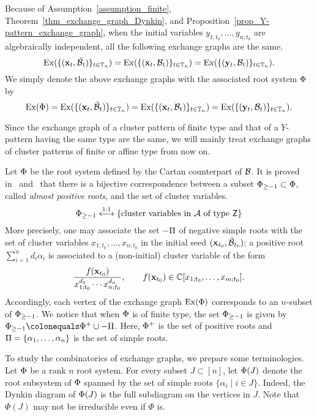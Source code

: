 Because of Assumption~\ref{assumption_finite}, Theorem~\ref{thm_exchange_graph_Dynkin}, and Proposition~\ref{prop_Y-pattern_exchange_graph}, 
when the initial variables $y_{1;t_0},\dots,y_{n;t_0}$ are algebraically independent, all the following exchange graphs are the same.
\[
\operatorname{Ex}(\{(\mathbf{x}_t, \mathcal{\tilde{B}}_t)\}_{t \in \mathbb T_n})
 = \operatorname{Ex}(\{(\mathbf{x}_t, \mathcal{B}_t)\}_{t \in \mathbb T_n})
= \operatorname{Ex}(\{(\mathbf{y}_t, \mathcal{B}_t)\}_{t \in \mathbb T_n}).
\]
We simply denote the above exchange graphs with the associated root system $\Phi$ by
\begin{equation}\label{eq_exchange_graphs_are_the_same}
\operatorname{Ex}(\Phi) = \operatorname{Ex}(\{(\mathbf{x}_t, \mathcal{\tilde{B}}_t)\}_{t \in \mathbb T_n})
 = \operatorname{Ex}(\{(\mathbf{x}_t, \mathcal{B}_t)\}_{t \in \mathbb T_n})
= \operatorname{Ex}(\{(\mathbf{y}_t, \mathcal{B}_t)\}_{t \in \mathbb T_n}).
\end{equation}

Since the exchange graph of a cluster pattern of finite type and that of a $Y$-pattern having the same type are the same, we will mainly treat exchange graphs of cluster patterns of finite or affine type from now on.

Let $\Phi$ be the root system defined by the Cartan counterpart of $\mathcal{B}$.
It is proved in~\cite{FZ2_2003} and~\cite{ReadingStella20} that there is a bijective correspondence between a subset $\Phi_{\ge -1} \subset \Phi$, called \emph{almost positive roots}, and the set of cluster variables.
\begin{equation}\label{equation_bijective_vars_alpostRoots_facets}
\Phi_{\ge -1} \stackrel{1:1}{\longleftrightarrow}\{\text{cluster variables in $\mathcal{A}$ of type $\mathsf{Z}$}\} 
\end{equation}
More precisely, one may associate the set $-\Pi$ of negative simple roots with the set of cluster variables $x_{1;t_0},\dots,x_{n;t_0}$ in the
initial seed $(\mathbf{x}_{t_0},\mathcal{\tilde{B}}_{t_0})$;  
a positive root $\sum_{i=1}^n d_i \alpha_i$ is associated to a (non-initial) cluster variable of the
form
\[
	\frac{f(\mathbf{x}_{t_0})}{x_{1;t_0}^{d_1} \cdots x_{n;t_0}^{d_n}},\qquad
	f(\mathbf{x}_{t_0})\in\mathbb{C}[x_{1;t_0},\dots, x_{m;t_0}].
\]
Accordingly, each vertex of the exchange graph $\operatorname{Ex}(\Phi)$ corresponds to an $n$-subset of $\Phi_{\ge -1}$. 
We notice that when $\Phi$ is of finite type, the set $\Phi_{\ge -1}$ is given by  $\alposRoots\colonequals \Roots^+ \cup -\SRoots$. 
Here, $\Phi^+$ is the set of positive roots and $\Pi=\{\alpha_1,\dots,\alpha_n\}$ is the set of simple roots. 

To study the combinatorics of exchange graphs, we prepare some terminologies.
Let $\Phi$ be a rank $n$ root system.
For every subset $J \subset [n]$, let $\Phi(J)$ denote the root subsystem
of $\Phi$ spanned by the set of simple roots $\{ \alpha_i \mid i \in J \}$.
Indeed, the Dynkin diagram of $\Phi(J)$ is the full subdiagram on the vertices in $J$. 
Note that $\Phi(J)$ may not be irreducible even if $\Phi$ is.

